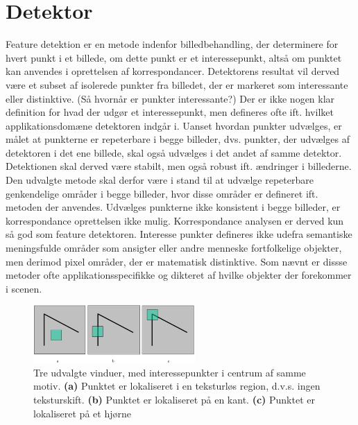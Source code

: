 \section{Detektor}
Feature detektion er en metode indenfor billedbehandling, der determinere for hvert punkt i et billede, om dette punkt er et interessepunkt, altså om punktet kan anvendes i oprettelsen af korrespondancer. Detektorens resultat vil derved være et subset af isolerede punkter fra billedet, der er markeret som interessante eller distinktive. (Så hvornår er punkter interessante?) Der er ikke nogen klar definition for hvad der udgør et interessepunkt, men defineres ofte ift. hvilket applikationsdomæne detektoren indgår i. Uanset hvordan punkter udvælges, er målet at punkterne er repeterbare i begge billeder, dvs. punkter, der udvælges af detektoren i det ene billede, skal også udvælges i det andet af samme detektor. Detektionen skal derved være stabilt, men også robust ift. ændringer i billederne. Den udvalgte metode skal derfor være i stand til at udvælge repeterbare genkendelige områder i begge billeder, hvor disse områder er defineret ift. metoden der anvendes.  Udvælges punkterne ikke konsistent i begge billeder, er korrespondance oprettelsen ikke mulig. Korrespondance analysen er derved kun så god som feature detektoren. 
Interesse punkter defineres ikke udefra semantiske meningsfulde områder som ansigter eller andre menneske fortfolkelige objekter, men derimod pixel områder, der er matematisk distinktive. Som nævnt er dissse metoder ofte applikationsspecifikke og dikteret af hvilke objekter der forekommer i scenen.
\begin{figure}[H]
    \centering
    \includegraphics[width=0.55\textwidth]{fig/6.png}
    \begin{center}    
    \caption{
     Tre udvalgte vinduer, med interessepunkter i centrum af samme motiv. \textbf{(a)} Punktet er lokaliseret i en teksturløs region, d.v.s. ingen teksturskift. \textbf{(b)} Punktet er lokaliseret på en kant. \textbf{(c)} Punktet er lokaliseret på et hjørne }
    \label{fig:2}
     \end{center}
  \end{figure}

